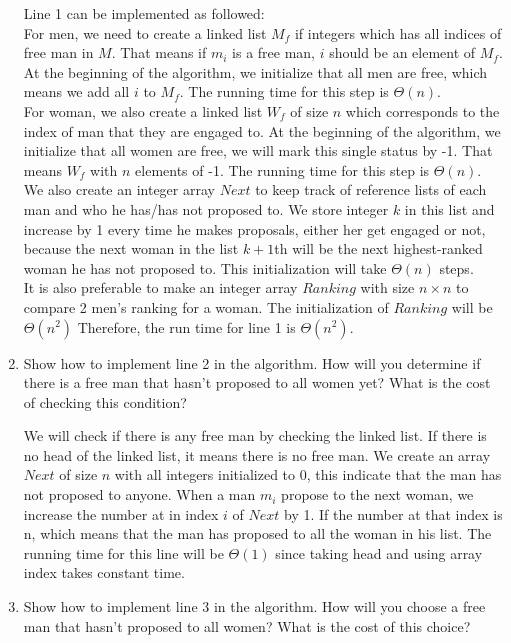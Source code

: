 \documentclass{cpsc413Solutions}
\begin{document}
\begin{problemlist}
\begin{problem}
\begin{answer}
\begin{enumerate}
    Line 1 can be implemented as followed:\\
    For men, we need to create a linked list $M_f$ if integers which has all indices of free man in $M$. That means if $m_i$ is a free man, $i$ should be an element of $M_f$. At the beginning of the algorithm, we initialize that all men are free, which means we add all $i$ to $M_f$. The running time for this step is $\Theta(n)$.\\
    For woman, we also create a linked list $W_f$ of size $n$ which corresponds to the index of man that they are engaged to. At the beginning of the algorithm, we initialize that all women are free, we will mark this single status by -1. That means $W_f$ with $n$ elements of -1. The running time for this step is $\Theta(n)$.\\
    We also create an integer array $Next$ to keep track of reference lists of each man and who he has/has not proposed to. We store integer $k$ in this list and increase by 1 every time he makes proposals, either her get engaged or not, because the next woman in the list $k+1$th will be the next highest-ranked woman he has not proposed to. This initialization will take $\Theta(n)$ steps.\\
    It is also preferable to make an integer array $Ranking$ with size $n \times n$ to compare 2 men's ranking for a woman. The initialization of $Ranking$ will be $\Theta(n^2)$
    Therefore, the run time for line 1 is $\Theta(n^2)$.
    
    \item Show how to implement line 2 in the algorithm. How will you determine if there is a free man that hasn’t proposed to all women yet? What is the cost of checking this condition?
    
    We will check if there is any free man by checking the linked list. If there is no head of the linked list, it means there is no free man. We create an array $Next$ of size $n$ with all integers initialized to 0, this indicate that the man has not proposed to anyone. When a man $m_i$ propose to the next woman, we increase the number at in index $i$ of $Next$ by 1. If the number at that index is n, which means that the man has proposed to all the woman in his list. The running time for this line will be $\Theta(1)$ since taking  head and using array index takes constant time.
    
    
    \item Show how to implement line 3 in the algorithm. How will you choose a free man that hasn’t proposed to all women? What is the cost of this choice?
    

\end{enumerate}
\end{answer}
\end{problem}
\end{problemlist}
\end{document}
